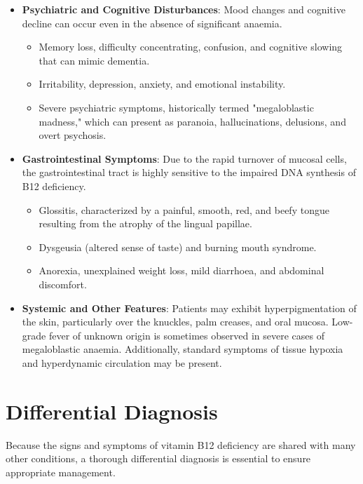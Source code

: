 \begin{itemize}
\begin{itemize}
    \end{itemize}
    \item \textbf{Psychiatric and Cognitive Disturbances}: Mood changes and cognitive decline can occur even in the absence of significant anaemia.
    \begin{itemize}
        \item Memory loss, difficulty concentrating, confusion, and cognitive slowing that can mimic dementia.
        \item Irritability, depression, anxiety, and emotional instability.
        \item Severe psychiatric symptoms, historically termed "megaloblastic madness," which can present as paranoia, hallucinations, delusions, and overt psychosis.
    \end{itemize}
    \item \textbf{Gastrointestinal Symptoms}: Due to the rapid turnover of mucosal cells, the gastrointestinal tract is highly sensitive to the impaired DNA synthesis of B12 deficiency.
    \begin{itemize}
        \item Glossitis, characterized by a painful, smooth, red, and beefy tongue resulting from the atrophy of the lingual papillae.
        \item Dysgeusia (altered sense of taste) and burning mouth syndrome.
        \item Anorexia, unexplained weight loss, mild diarrhoea, and abdominal discomfort.
    \end{itemize}
    \item \textbf{Systemic and Other Features}: Patients may exhibit hyperpigmentation of the skin, particularly over the knuckles, palm creases, and oral mucosa. Low-grade fever of unknown origin is sometimes observed in severe cases of megaloblastic anaemia. Additionally, standard symptoms of tissue hypoxia and hyperdynamic circulation may be present.
\end{itemize}

\section*{Differential Diagnosis}
Because the signs and symptoms of vitamin B12 deficiency are shared with many other conditions, a thorough differential diagnosis is essential to ensure appropriate management.

